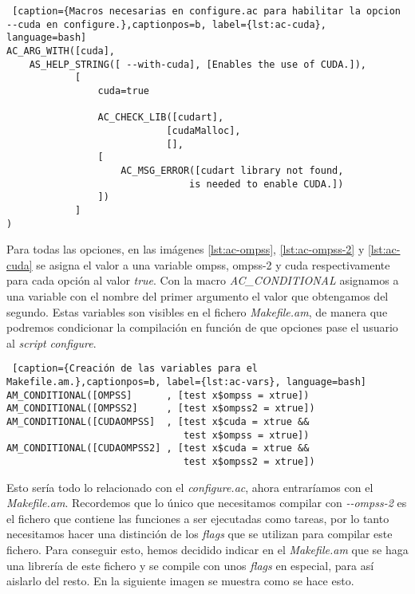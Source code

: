 \begin{lstlisting} [caption={Macros necesarias en configure.ac para habilitar la opcion --cuda en configure.},captionpos=b, label={lst:ac-cuda}, language=bash]
AC_ARG_WITH([cuda],
    AS_HELP_STRING([ --with-cuda], [Enables the use of CUDA.]),
            [
                cuda=true

                AC_CHECK_LIB([cudart], 
                            [cudaMalloc], 
                            [],
                [
                    AC_MSG_ERROR([cudart library not found, 
                                is needed to enable CUDA.])
                ])
            ]
)
\end{lstlisting}

Para todas las opciones, en las imágenes \ref{lst:ac-ompss}, \ref{lst:ac-ompss-2} y \ref{lst:ac-cuda} se asigna el valor a una variable ompss, ompss-2 y cuda respectivamente para cada opción al valor \textit{true}. Con la macro \textit{AC\_CONDITIONAL} asignamos a una variable con el nombre del primer argumento el valor que obtengamos del segundo. Estas variables son visibles en el fichero \textit{Makefile.am}, de manera que podremos condicionar la compilación en función de que opciones pase el usuario al \textit{script} \textit{configure}.
\smallskip

\begin{lstlisting} [caption={Creación de las variables para el Makefile.am.},captionpos=b, label={lst:ac-vars}, language=bash]
AM_CONDITIONAL([OMPSS]      , [test x$ompss = xtrue])
AM_CONDITIONAL([OMPSS2]     , [test x$ompss2 = xtrue])
AM_CONDITIONAL([CUDAOMPSS]  , [test x$cuda = xtrue && 
                               test x$ompss = xtrue])
AM_CONDITIONAL([CUDAOMPSS2] , [test x$cuda = xtrue && 
                               test x$ompss2 = xtrue])
\end{lstlisting}

Esto sería todo lo relacionado con el \textit{configure.ac}, ahora entraríamos con el \textit{Makefile.am}. Recordemos que lo único que necesitamos compilar con \textit{-{}-ompss-2} es el fichero que contiene las funciones a ser ejecutadas como tareas, por lo tanto necesitamos hacer una distinción de los \textit{flags} que se utilizan para compilar este fichero. Para conseguir esto, hemos decidido indicar en el \textit{Makefile.am} que se haga una librería de este fichero y se compile con unos \textit{flags} en especial, para así aislarlo del resto. En la siguiente imagen se muestra como se hace esto.
\smallskip

